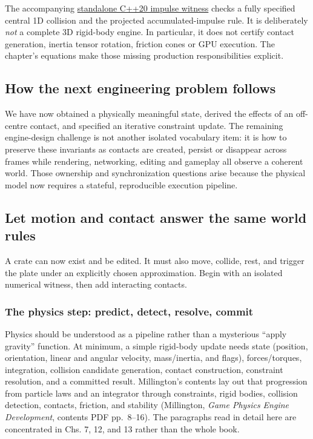 The accompanying \href{../../tools/labs/rigid_body_contact_lab.cpp}{standalone C++20 impulse witness} checks a fully specified central 1D collision and the projected accumulated-impulse rule. It is deliberately \emph{not} a complete 3D rigid-body engine. In particular, it does not certify contact generation, inertia tensor rotation, friction cones or GPU execution. The chapter's equations make those missing production responsibilities explicit.

\subsection{How the next engineering problem follows}\label{how-the-next-engineering-problem-follows}

We have now obtained a physically meaningful state, derived the effects of an off-centre contact, and specified an iterative constraint update. The remaining engine-design challenge is not another isolated vocabulary item: it is how to preserve these invariants as contacts are created, persist or disappear across frames while rendering, networking, editing and gameplay all observe a coherent world. Those ownership and synchronization questions arise because the physical model now requires a stateful, reproducible execution pipeline.

\subsection{Let motion and contact answer the same world rules}\label{let-motion-and-contact-answer-the-same-world-rules}

A crate can now exist and be edited. It must also move, collide, rest, and trigger the plate under an explicitly chosen approximation. Begin with an isolated numerical witness, then add interacting contacts.

\subsubsection{The physics step: predict, detect, resolve, commit}\label{the-physics-step-predict-detect-resolve-commit}

Physics should be understood as a pipeline rather than a mysterious ``apply gravity'' function. At minimum, a simple rigid-body update needs state (position, orientation, linear and angular velocity, mass/inertia, and flags), forces/torques, integration, collision candidate generation, contact construction, constraint resolution, and a committed result. Millington's contents lay out that progression from particle laws and an integrator through constraints, rigid bodies, collision detection, contacts, friction, and stability (Millington, \emph{Game Physics Engine Development}, contents PDF pp.~8--16). The paragraphs read in detail here are concentrated in Chs. 7, 12, and 13 rather than the whole book.

